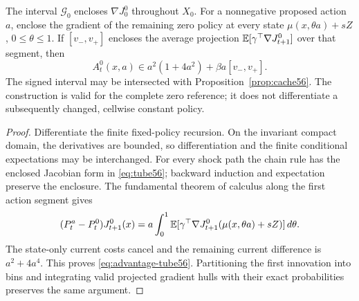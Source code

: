 \begin{proposition}\label{prop:tube56}
The interval $\mathcal G_0$ encloses $\nabla J_0^0$ throughout $X_0$. For a nonnegative proposed action $a$, enclose the gradient of the remaining zero policy at every state
$\mu(x,\theta a)+sZ$, $0\le\theta\le1$. If $[v_-,v_+]$ encloses the average projection $\mathbb E[\gamma^\top\nabla J_{t+1}^0]$ over that segment, then
\begin{equation}\label{eq:advantage-tube56}
 A_t^0(x,a)\in a^2(1+4a^2)+\beta a[v_-,v_+].
\end{equation}
The signed interval may be intersected with Proposition~\ref{prop:cache56}. The construction is valid for the complete zero reference; it does not differentiate a subsequently changed, cellwise constant policy.
\end{proposition}
\begin{proof}
Differentiate the finite fixed-policy recursion. On the invariant compact domain, the derivatives are bounded, so differentiation and the finite conditional expectations may be interchanged. For every shock path the chain rule has the enclosed Jacobian form in \eqref{eq:tube56}; backward induction and expectation preserve the enclosure. The fundamental theorem of calculus along the first action segment gives
\[
 (P_t^a-P_t^0)J_{t+1}^0(x)
 =a\int_0^1\mathbb E[\gamma^\top\nabla J_{t+1}^0(\mu(x,\theta a)+sZ)]\,d\theta.
\]
The state-only current costs cancel and the remaining current difference is $a^2+4a^4$. This proves \eqref{eq:advantage-tube56}. Partitioning the first innovation into bins and integrating valid projected gradient hulls with their exact probabilities preserves the same argument.
\end{proof}

